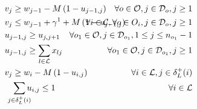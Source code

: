 \begin{alignat}{3}
    \label{mod:c16}        & v_{j} \geq w_{j-1} - M\left(1- u_{j-1,j}\right)                                                                                                                                                                                                                                                  & \hspace{-20mm}  \forall o \in \mathcal{O}, j \in \mathcal{D}_{o}, j \geq 1                       \\
    \label{mod:c17}        & v_{j}  \leq  w_{j-1} + \gamma^1 + M\left(1- u_{j-1,j}\right)                                                                                                                                                                                                                                     & \hspace{-20mm} \forall i \in \mathcal{C}, \forall o \in O_i, j \in \mathcal{D}_{o}, j \geq 1     \\
    \label{mod:c18}        & u_{j-1,j} \geq u_{j,j+1}                                                                                                                                                                                                                                                                         & \hspace{-35mm} \forall o_1 \in\mathcal{O},  j \in \mathcal{D}_{o_1}, 1 \leq j \leq n_{o_{1}}-1   \\
    \label{mod:c19}        & u_{j-1,j} \geq \sum_{l \in \mathcal{L}}{x_{lj}}                                                                                                                                                                                                                                                  & \hspace{-20mm}  \forall o_1 \in \mathcal{O}, j \in \mathcal{D}_{o_1}, j \geq 1                   \\
    \label{mod:c20}        & v_{j} \geq w_{i} - M\left(1- u_{i,j}\right)                                                                                                                                                                                                                                                      & \hspace{-20mm}  \forall i \in \mathcal{L}, j \in \delta^{+}_{L}(i)                               \\
    \label{mod:c21}        & \hspace{3mm} \smashoperator{ \sum_{ j \in \delta^{+}_{L}(i)}}{u_{i,j } } \leq 1                                                                                                                                                                                                                  & \hspace{-20mm}  \forall i \in \mathcal{L}                                                        \\

\end{alignat}
